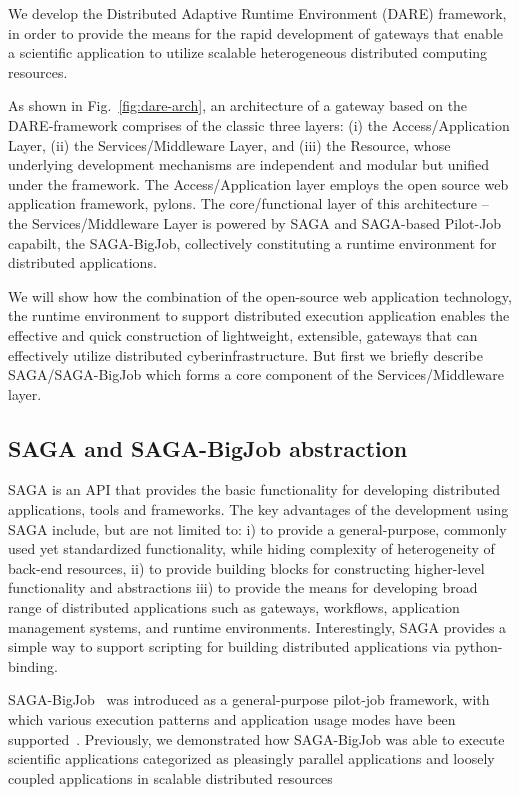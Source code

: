 \documentclass{sig-alternate}
\begin{document}
We develop the Distributed Adaptive Runtime Environment (DARE)
framework\cite{dareurl}, in order to provide the means for the rapid
development of gateways that enable a scientific application to
utilize scalable heterogeneous distributed computing resources.

As shown in Fig.~\ref{fig:dare-arch}, an architecture of a gateway
based on the DARE-framework comprises of the classic three layers: (i)
the Access/Application Layer, (ii) the Services/Middleware Layer, and (iii) the
Resource, whose underlying development mechanisms are independent and
modular but unified under the framework.  The Access/Application layer
employs the open source web application framework,
pylons\cite{pylonsurl}.  The core/functional layer of this
architecture -- the Services/Middleware Layer is powered by SAGA and
SAGA-based Pilot-Job capabilt, the SAGA-BigJob\cite{saga-ccgrid10,jha2009developing,ecmls10, ecmls11},
collectively constituting a runtime environment for distributed
applications.

We will show how the combination of the open-source web application
technology, the runtime environment to support distributed execution
application enables the effective and quick construction of
lightweight, extensible, gateways that can effectively utilize
distributed cyberinfrastructure. But first we briefly describe
SAGA/SAGA-BigJob which forms a core component of the
Services/Middleware layer.

\subsection{SAGA and SAGA-BigJob abstraction}

SAGA is an API that provides the basic functionality for developing
distributed applications, tools and frameworks\cite{saga-web}. The key
advantages of the development using SAGA include, but are not limited
to: i) to provide a general-purpose, commonly used yet standardized
functionality, while hiding complexity of heterogeneity of back-end
resources, ii) to provide building blocks for constructing higher-level
functionality and abstractions iii) to provide the means for
developing broad range of distributed applications such as gateways,
workflows, application management systems, and runtime environments.
Interestingly, SAGA provides a simple way to support scripting
for building distributed applications via python-binding. 

SAGA-BigJob~\cite{saga-ccgrid10} was introduced as a general-purpose
pilot-job framework, with which various execution patterns and
application usage modes have been
supported~\cite{async_repex11,saga-royalsoc}.  Previously, we
demonstrated how SAGA-BigJob was able to execute scientific
applications categorized as pleasingly parallel applications and
loosely coupled applications in scalable distributed
resources\cite{jha2009developing, ecmls10, ecmls11}
\end{document}
